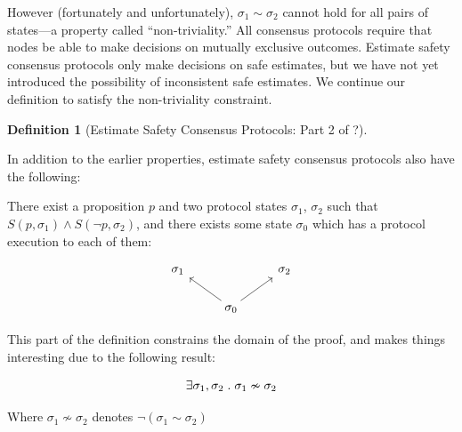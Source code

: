 \documentclass{article}
\theoremstyle{definition}
\newtheorem{defn}{Definition}[section]
\begin{document}
However (fortunately and unfortunately), $\sigma_1 \sim \sigma_2$ cannot hold for all pairs of states---a property called ``non-triviality.'' All consensus protocols require that nodes be able to make decisions on mutually exclusive outcomes. Estimate safety consensus protocols only make decisions on safe estimates, but we have not yet introduced the possibility of inconsistent safe estimates. We continue our definition to satisfy the non-triviality constraint.

\begin{defn}[Estimate Safety Consensus Protocols: Part 2 of ?]
\begin{description}

In addition to the earlier properties, estimate safety consensus protocols also have the following:

\item[(Non-triviality)]

There exist a proposition $p$ and two protocol states $\sigma_1$, $\sigma_2$ such that $S(p,\sigma_1) \land S(\neg{p},\sigma_2)$, and there exists some state $\sigma_0$ which has a protocol execution to each of them:

\begin{equation*}
\begin{tikzcd}
\sigma_1  
  &
{}
  &
\sigma_2
  \\ 
  &
\sigma_0
  \arrow[ur,""]
  \arrow[ul,""]
\end{tikzcd}
\end{equation*}


\end{description}
\end{defn}

This part of the definition constrains the domain of the proof, and makes things interesting due to the following result:

\begin{lemma}
$$
\exists \sigma_1, \sigma_2 \hspace{1mm}.\hspace{1mm} \sigma_1 \nsim \sigma_2
$$
\end{lemma}

Where $\sigma_1 \nsim \sigma_2$ denotes $\neg{(\sigma_1 \sim \sigma_2)}$
\end{document}
